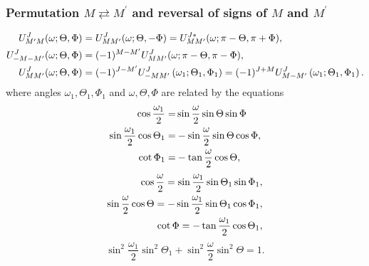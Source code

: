 \subsubsection{ Permutation $M\rightleftarrows M^{\prime}$ and reversal of signs of $M$ and $M^{\prime}$}
\begin{align}
U_{M^{\prime} M}^{J}(\omega ; \Theta, \Phi) & =U_{M M^{\prime}}^{J}(\omega ; \Theta,-\Phi)=U_{M M^{\prime}}^{J *}(\omega ; \pi-\Theta, \pi+\Phi) , \notag\\
U_{-M-M^{\prime}}^{J}(\omega ; \Theta, \Phi) & =(-1)^{M-M^{\prime}} U_{M M^{\prime}}^{J}(\omega ; \pi-\Theta, \pi-\Phi) , \label{eq:4:5:22}\\
U_{M M^{\prime}}^{J}(\omega ; \Theta, \Phi) & =(-1)^{J-M^{\prime}} U_{-M M^{\prime}}^{J}\left(\omega_{1} ; \Theta_{1}, \Phi_{1}\right)=(-1)^{J+M} U_{M-M^{\prime}}^{J}\left(\omega_{1} ; \Theta_{1}, \Phi_{1}\right) .\notag
\end{align}
where angles $\omega_{1}, \Theta_{1}, \Phi_{1}$ and $\omega, \Theta, \Phi$ are related by the equations
\begin{align}
\cos \frac{\omega_{1}}{2}=&\sin \frac{\omega}{2} \sin \Theta \sin \Phi  \notag\\
\sin \frac{\omega_{1}}{2} \cos \Theta_{1}=&-\sin \frac{\omega}{2} \sin \Theta \cos \Phi , \label{eq:4:5:23}\\
\cot \Phi_{1}=&-\tan \frac{\omega}{2} \cos \Theta  ,\notag
\end{align}
\begin{align}
\cos \frac{\omega}{2}=\sin \frac{\omega_{1}}{2} \sin \Theta_{1} \sin \Phi_{1}  ,\notag\\
\sin \frac{\omega}{2} \cos \Theta=-\sin \frac{\omega_{1}}{2} \sin \Theta_{1} \cos \Phi_{1}  ,\label{eq:4:5:24}\\
\cot \Phi=-\tan \frac{\omega_{1}}{2} \cos \Theta_{1} ,\notag
\end{align}
\begin{equation}
\sin ^{2} \frac{\omega_{1}}{2} \sin ^{2} \Theta_{1}+\sin ^{2} \frac{\omega}{2} \sin ^{2} \Theta =1 .\label{eq:4:5:25}
\end{equation}

